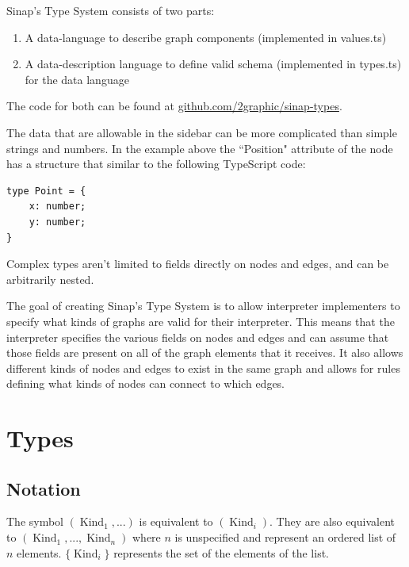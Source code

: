 \documentclass{article}
\begin{document}
Sinap's Type System consists of two parts:

\begin{enumerate}
    \item A data-language to describe graph components 
    (implemented in values.ts)
    \item A data-description language to define valid schema 
    (implemented in types.ts)
    for the data language
\end{enumerate}

The code for both can be found at 
\href{https://github.com/2graphic/sinap-types}
{github.com/2graphic/sinap-types}.

The data that are allowable in the sidebar can be more complicated than
simple strings and numbers. In the example above the ``Position" attribute
of the node has a structure that similar to the following TypeScript code:

\begin{samepage}
\begin{verbatim}
type Point = {
    x: number;
    y: number;
}
\end{verbatim}
\end{samepage}

Complex types aren't limited to fields directly on nodes and edges,
and can be arbitrarily nested. 

The goal of creating Sinap's Type System is to allow interpreter 
implementers to specify what 
kinds of graphs are valid for their interpreter. This means that 
the interpreter specifies the various fields on nodes and edges 
and can assume that those fields are present on all of the graph elements
that it receives. It also allows different kinds of nodes and edges to
exist in the same graph and allows for rules defining what kinds of
nodes can connect to which edges. 

\section{Types}

\subsection{Notation}

The symbol \((\operatorname{Kind}_1, ...)\) is equivalent to 
\((\operatorname{Kind}_i)\). They are also equivalent to 
\((\operatorname{Kind}_1, ..., \operatorname{Kind}_n)\)
where \(n\) is unspecified and represent an ordered list 
of \(n\) elements. \(\{\operatorname{Kind}_i\}\) represents 
the set of the elements of the list. 
\end{document}
